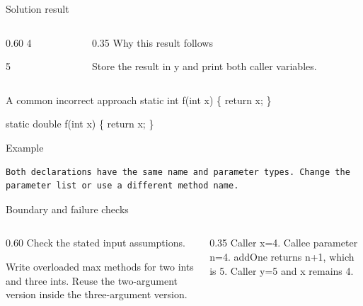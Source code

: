 \documentclass[10pt,aspectratio=169]{beamer}
\begin{document}
\begin{frame}[fragile,t]{Solution result}
\begin{columns}[T,onlytextwidth]\begin{column}{0.60\textwidth}
4\par 5
\end{column}\begin{column}{0.35\textwidth}\small
Why this result follows

Store the result in y and print both caller variables.
\end{column}\end{columns}
\end{frame}

\begin{frame}[fragile,t]{A common incorrect approach}
static int f(int x) \{ return x; \}\par static double f(int x) \{ return x; \}
\vspace{1mm}\begin{block}{Example}
\begin{lstlisting}
Both declarations have the same name and parameter types. Change the parameter list or use a different method name.
\end{lstlisting}
\end{block}
\end{frame}

\begin{frame}[fragile,t]{Boundary and failure checks}
\begin{columns}[T,onlytextwidth]\begin{column}{0.60\textwidth}
Check the stated input assumptions.

Write overloaded max methods for two ints and three ints. Reuse the two-argument version inside the three-argument version.
\end{column}\begin{column}{0.35\textwidth}\small
Caller x=4. Callee parameter n=4. addOne returns n+1, which is 5. Caller y=5 and x remains 4.
\end{column}\end{columns}
\end{frame}
\end{document}

